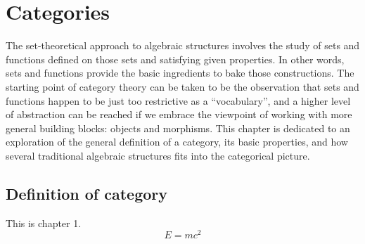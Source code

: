 \chapter{Categories}
\label{chap:chap1}

The set-theoretical approach to algebraic structures involves the study of sets and functions defined on those sets and satisfying given properties. In other words, sets and functions provide the basic ingredients to bake those constructions. The starting point of category theory can be taken to be the observation that sets and functions happen to be just too restrictive as a ``vocabulary'', and a higher level of abstraction can be reached if we embrace the viewpoint of working with more general building blocks: objects and morphisms. This chapter is dedicated to an exploration of the general definition of a category, its basic properties, and how several traditional algebraic structures fits into the categorical picture. 

\section{Definition of category}

This is chapter 1.
\begin{dmath}
E = mc^2
\end{dmath}
